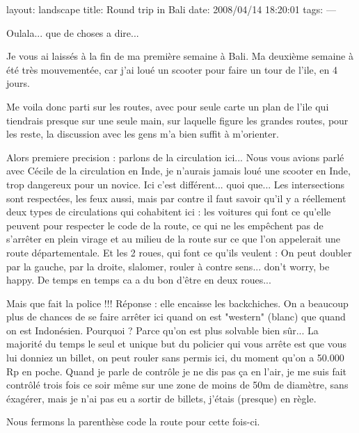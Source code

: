 layout: landscape
title: Round trip in Bali
date: 2008/04/14 18:20:01
tags:
---

Oulala... que de choses a dire...

Je vous ai laissés à la fin de ma première semaine à Bali. Ma deuxième semaine à été très mouvementée, car j'ai loué un scooter pour faire un tour de l'ile, en 4 jours.

Me voila donc parti sur les routes, avec pour seule carte un plan de l'ile qui tiendrais presque sur une seule main, sur laquelle figure les grandes routes, pour les reste, la discussion avec les gens m'a bien suffit à m'orienter.

Alors premiere precision : parlons de la circulation ici... Nous vous avions parlé avec Cécile de la circulation en Inde, je n'aurais jamais loué une scooter en Inde, trop dangereux pour un novice. Ici c'est différent... quoi que... Les intersections sont respectées, les feux aussi, mais par contre il faut savoir qu'il y a réellement deux types de circulations qui cohabitent ici : les voitures qui font ce qu'elle peuvent pour respecter le code de la route, ce qui ne les empêchent pas de s'arrêter en plein virage et au milieu de la route sur ce que l'on appelerait une route départementale. Et les 2 roues, qui font ce qu'ils veulent : On peut doubler par la gauche, par la droite, slalomer, rouler à contre sens... don't worry, be happy. De temps en temps ca a du bon d'être en deux roues...

Mais que fait la police !!! Réponse : elle encaisse les backchiches. On a beaucoup plus de chances de se faire arrêter ici quand on est "western" (blanc) que quand on est Indonésien. Pourquoi ? Parce qu'on est plus solvable bien sûr... La majorité du temps le seul et unique but du policier qui vous arrête est que vous lui donniez un billet, on peut rouler sans permis ici, du moment qu'on a 50.000 Rp en poche. Quand je parle de contrôle je ne dis pas ça en l'air, je me suis fait contrôlé trois fois ce soir même sur une zone de moins de 50m de diamètre, sans éxagérer, mais je n'ai pas eu a sortir de billets, j'étais (presque) en règle.

Nous fermons la parenthèse code la route pour cette fois-ci.

